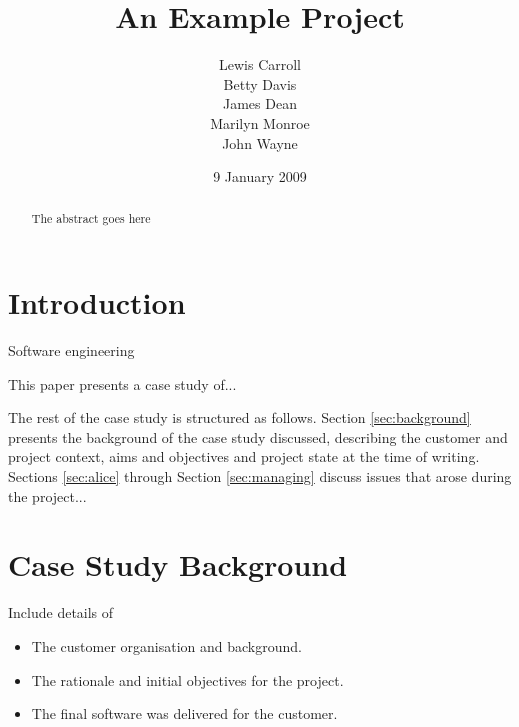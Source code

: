\documentclass{l3proj}
\begin{document}
\title{An Example Project}

\author{Lewis Carroll \\
        Betty Davis \\
        James Dean \\
        Marilyn Monroe \\
        John Wayne}

\date{9 January 2009}

\maketitle

\begin{abstract}

The abstract goes here

\end{abstract}

\educationalconsent

\newpage

\section{Introduction}

Software engineering 

This paper presents a case study of... 


The rest of the case study is structured as follows.  Section
\ref{sec:background} presents the background of the case study
discussed, describing the customer and project context, aims and
objectives and project state at the time of writing.  Sections
\ref{sec:alice} through Section \ref{sec:managing} discuss issues that
arose during the project...

\section{Case Study Background}

Include details of 

\begin{itemize}
\item The customer organisation and background.
\item The rationale and initial objectives for the project.
\item The final software was delivered for the customer.
\end{itemize}
\end{document}
